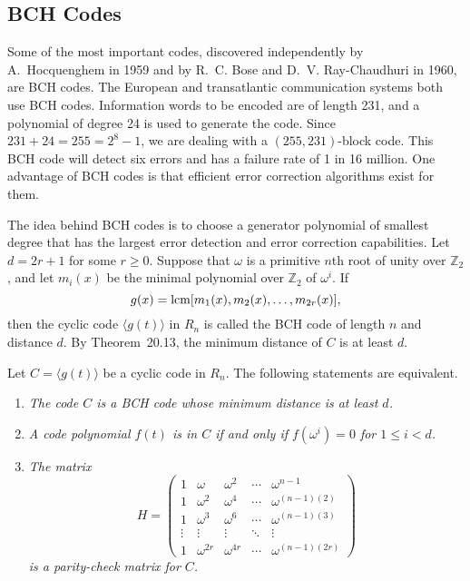 \subsection*{BCH Codes}
 
Some of the most important codes,
discovered independently by A.~Hocquenghem in 1959 and by R.~C. Bose and D.~V. Ray-Chaudhuri in 1960, are BCH codes.  The European and transatlantic  communication systems both use BCH codes.  Information words to be
encoded are of length 231, and a polynomial of degree 24 is used to
generate the code.  Since $231 + 24 = 255 = 2^8-1$, we are dealing
with a \mbox{$(255, 231)$-block} code. This BCH code will detect six
errors and has a failure rate of 1 in 16 million. One advantage of BCH
codes is that efficient error correction algorithms exist for them. 


The idea behind BCH codes is to choose a generator polynomial of
smallest degree that has the largest error detection and error
correction 
capabilities. Let $d = 2r + 1$ for some $r \geq 0$.  Suppose that
$\omega$ is a primitive $n$th root of unity over ${\mathbb Z}_2$, and
let $m_i(x)$ be the minimal polynomial over ${\mathbb Z}_2$ of
$\omega^i$. If  
$$
g(x) = \operatorname{lcm}[ m_1(x), m_{2}(x), \ldots, m_{2r}(x)],
$$
then the cyclic code $\langle g(t) \rangle$ in $R_n$ is called the
{\bfi BCH code of length} $n$ {\bfi and distance} $d$.
By Theorem~20.13, the minimum distance of $C$ is at least $d$. 


\begin{theorem}
Let $C = \langle g(t) \rangle$ be a cyclic code in $R_n$. The
following statements are equivalent. 
\begin{enumerate}

\rm\item\it
The code $C$ is a BCH code whose minimum distance is at least $d$.


\rm\item\it
A code polynomial $f(t)$ is in $C$ if and only if $f( \omega^i) = 0$
for $1 \leq i < d$. 

\rm\item\it
The matrix 
$$
H
=
\left(
\begin{array}{ccccc}
1      & \omega      & \omega^2    & \cdots & \omega^{n-1}\\
1      & \omega^2    & \omega^{4}  & \cdots & \omega^{(n-1)(2)} \\
1      & \omega^3    & \omega^{6}  & \cdots & \omega^{(n-1)(3)} \\
\vdots & \vdots      & \vdots      & \ddots & \vdots \\
1      & \omega^{2r} & \omega^{4r} & \cdots & \omega^{(n-1)(2r)} 
\end{array}
\right)
$$
is a parity-check matrix for $C$.

\end{enumerate}
\end{theorem}


